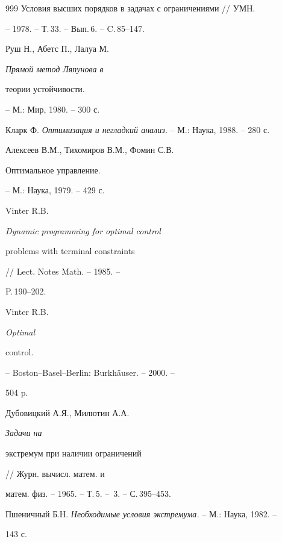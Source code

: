\begin{thebibliography}{999}
{Условия высших порядков в задачах с ограничениями} // УМН.


-- 1978. -- Т.\,33. -- Вып.\,6. -- C.\,85--147.




Руш Н., Абетс П., Лалуа М. {\it Прямой метод Ляпунова в


теории устойчивости.} -- М.: Мир, 1980. -- 300 с.




Кларк Ф. {\it Оптимизация и негладкий анализ.} -- М.: Наука, 1988. -- 280 с.




Алексеев В.М., Тихомиров В.М., Фомин С.В. {\it


Оптимальное управление.} -- М.: Наука, 1979. -- 429 с.




Vinter R.B. {\it Dynamic programming for optimal control


problems with terminal constraints} // Lect. Notes Math. -- 1985. --


P.\,190--202.




Vinter R.B. {\it Optimal


control.} -- Boston--Basel--Berlin: Burkh\"auser. -- 2000. --


504 p.




Дубовицкий А.Я., Милютин А.А. {\it Задачи на


экстремум при наличии ограничений} // Журн. вычисл. матем. и


матем. физ. -- 1965. -- Т.\,5. -- \No\,3. -- С.\,395--453.




Пшеничный Б.Н. {\it Необходимые условия экстремума.} -- М.: Наука, 1982. --


143 с.


\end{thebibliography}





\vskip 2cm












\label{end}








